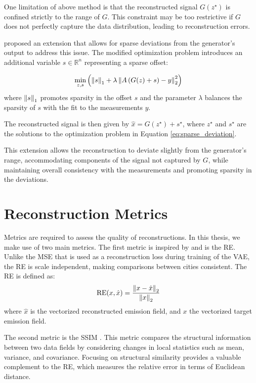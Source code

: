 One limitation of above method is that the reconstructed signal $G(z^{\star})$ is confined strictly to the range of $G$.
This constraint may be too restrictive if $G$ does not perfectly capture the data distribution, leading to reconstruction errors.

\textcite{SparseCSUsingAI} proposed an extension that allows for sparse deviations from the generator's output to address this issue.
The modified optimization problem introduces an additional variable $s \in \mathbb{R}^n$ representing a sparse offset:

\begin{equation}
    \min_{z, s}{\left(\left\lVert s\right\rVert_1 + \lambda \left\lVert A \left( G(z) + s \right) - y\right\rVert_2^2 \right)}
    \label{eq:sparse_deviation}
\end{equation}
where $\left\lVert s\right\rVert_1$ promotes sparsity in the offset $s$ and the parameter $\lambda$ balances the sparsity of $s$ with the fit to the measurements $y$.

The reconstructed signal is then given by $\hat{x} = G(z^\star) + s^\star$, where $z^\star$ and $s^\star$ are the solutions to the optimization problem in Equation \ref{eq:sparse_deviation}.

This extension allows the reconstruction to deviate slightly from the generator's range, accommodating components of the signal not captured by $G$, while maintaining overall consistency with the measurements and promoting sparsity in the deviations.

\section{Reconstruction Metrics}
Metrics are required to assess the quality of reconstructions.
In this thesis, we make use of two main metrics.
The first metric is inspired by \textcite{UrbanSparseReconstruction} and is the \gls{RE}.
Unlike the \gls{MSE} that is used as a reconstruction loss during training of the \gls{VAE}, the \gls{RE} is scale independent, making comparisons between cities consistent.
The \gls{RE} is defined as: 
\begin{equation}
    \text{RE}(x, \hat{x}) = \frac{\left\lVert x - \hat{x}\right\rVert_2}{\left\lVert x\right\rVert_2}
\end{equation}
where $\hat{x}$ is the vectorized reconstructed emission field, and $x$ the vectorized target emission field.

The second metric is the \gls{SSIM} \parencite{SSIM}.
This metric compares the structural information between two data fields by considering changes in local statistics such as mean, variance, and covariance.
Focusing on structural similarity provides a valuable complement to the \gls{RE}, which measures the relative error in terms of Euclidean distance.

